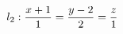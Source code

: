\documentclass[preview]{standalone}
\begin{document}
\begin{align*}
\special{dvisvgm:raw <g id='unique000'>}l_2:\dfrac{x+1}{1}=\dfrac{y-2}{2}=\dfrac{z}{1}\special{dvisvgm:raw </g>}
\end{align*}
\end{document}
